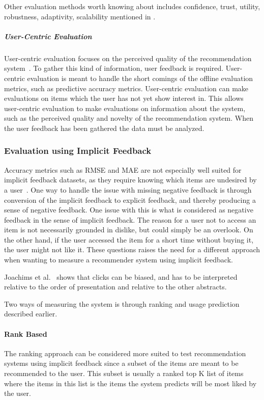 Other evaluation methods worth knowing about includes confidence, trust, utility, robustness, adaptivity, scalability mentioned in \cite{Herlocker2004, Shani2011}.

\subparagraph{User-Centric Evaluation}
User-centric evaluation focuses on the perceived quality of the recommendation system~\cite{Pu:2011:UEF:2043932.2043962,Knijnenburg:2011:PPS:2043932.2043993}.
To gather this kind of information, user feedback is required.
User-centric evaluation is meant to handle the short comings of the offline evaluation metrics, such as predictive accuracy metrics.
User-centric evaluation can make evaluations on items which the user has not yet show interest in.
This allows user-centric evaluation to make evaluations on information about the system, such as the perceived quality and novelty of the recommendation system.
When the user feedback has been gathered the data must be analyzed.



\subsubsection{Evaluation using Implicit Feedback}
Accuracy metrics such as RMSE and MAE are not especially well suited for implicit feedback datasets, as they require knowing which items are undesired by a user~\cite{Hu2008}.
One way to handle the issue with missing negative feedback is through conversion of the implicit feedback to explicit feedback, and thereby producing a sense of negative feedback.
One issue with this is what is considered as negative feedback in the sense of implicit feedback.
The reason for a user not to access an item is not necessarily grounded in dislike, but could simply be an overlook.
On the other hand, if the user accessed the item for a short time without buying it, the user might not like it.
These questions raises the need for a different approach when wanting to measure a recommender system using implicit feedback.

Joachims et al.~\cite{Joachims07evaluatingthe} shows that clicks can be biased, and has to be interpreted relative to the order of presentation and relative to the other abstracts.


Two ways of measuring the system is through ranking and usage prediction described earlier.

\paragraph{Rank Based} %
	\label{par:Ranking_based}
	The ranking approach can be considered more suited to test recommendation systems using implicit feedback since a subset of the items are meant to be recommended to the user.
	This subset is usually a ranked top K list of items where the items in this list is the items the system predicts will be most liked by the user.

